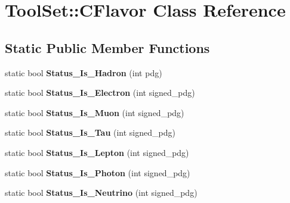 \hypertarget{classToolSet_1_1CFlavor}{
\section{ToolSet::CFlavor Class Reference}
\label{classToolSet_1_1CFlavor}
}
\subsection*{Static Public Member Functions}
\begin{DoxyCompactItemize}
\item 
\hypertarget{classToolSet_1_1CFlavor_ac28da759e1e766e4ec1568ab5cf08154}{
static bool {\bfseries Status\_\-Is\_\-Hadron} (int pdg)}
\label{classToolSet_1_1CFlavor_ac28da759e1e766e4ec1568ab5cf08154}

\item 
\hypertarget{classToolSet_1_1CFlavor_ad4347d36438418d276865e8db5824c9a}{
static bool {\bfseries Status\_\-Is\_\-Electron} (int signed\_\-pdg)}
\label{classToolSet_1_1CFlavor_ad4347d36438418d276865e8db5824c9a}

\item 
\hypertarget{classToolSet_1_1CFlavor_adcd6a29bea85472ac52d97028def4bb6}{
static bool {\bfseries Status\_\-Is\_\-Muon} (int signed\_\-pdg)}
\label{classToolSet_1_1CFlavor_adcd6a29bea85472ac52d97028def4bb6}

\item 
\hypertarget{classToolSet_1_1CFlavor_a8cc1db857540f9fd610ea64b218d90b6}{
static bool {\bfseries Status\_\-Is\_\-Tau} (int signed\_\-pdg)}
\label{classToolSet_1_1CFlavor_a8cc1db857540f9fd610ea64b218d90b6}

\item 
\hypertarget{classToolSet_1_1CFlavor_aa982b9c4e90cb14ad3f476749de9d013}{
static bool {\bfseries Status\_\-Is\_\-Lepton} (int signed\_\-pdg)}
\label{classToolSet_1_1CFlavor_aa982b9c4e90cb14ad3f476749de9d013}

\item 
\hypertarget{classToolSet_1_1CFlavor_a466a56fa328a96bc9cf24d0014d570a6}{
static bool {\bfseries Status\_\-Is\_\-Photon} (int signed\_\-pdg)}
\label{classToolSet_1_1CFlavor_a466a56fa328a96bc9cf24d0014d570a6}

\item 
\hypertarget{classToolSet_1_1CFlavor_aefc846be6a676f2a7da2afb6d1c2ca2b}{
static bool {\bfseries Status\_\-Is\_\-Neutrino} (int signed\_\-pdg)}
\label{classToolSet_1_1CFlavor_aefc846be6a676f2a7da2afb6d1c2ca2b}


\end{DoxyCompactItemize}
